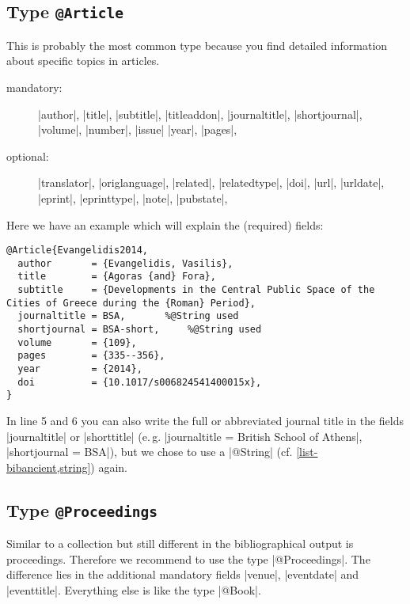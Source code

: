 \documentclass[a4paper,
10pt,
greek,
french,
spanish,
italian,
ngerman,
english
]{ltxdoc}
\begin{document}
\begin{refsection}\end{refsection}


\subsection{Type \texttt{@Article}}\label{article}
 This is probably the most common type 
because you find detailed information about specific topics in articles.

\begin{description}
\item[mandatory:] 
|author|, |title|, |subtitle|, |titleaddon|,
|journaltitle|, |shortjournal|, |volume|, |number|, |issue|
|year|, |pages|, 
\item[optional:]
|translator|, |origlanguage|,
|related|, |relatedtype|,
|doi|, |url|, |urldate|, |eprint|, |eprinttype|, |note|, |pubstate|, 
 \end{description}

Here we have an example which will explain the (required)  fields:
\begin{lstlisting}[style=bibentry,label=Evangelidis2014,caption={{@}Article\{Evangelidis2014,…\} }]
@Article{Evangelidis2014,
  author       = {Evangelidis, Vasilis},
  title        = {Agoras {and} Fora},
  subtitle     = {Developments in the Central Public Space of the Cities of Greece during the {Roman} Period},
  journaltitle = BSA,		%@String used
  shortjournal = BSA-short,		%@String used
  volume       = {109},
  pages        = {335--356},
  year         = {2014},
  doi          = {10.1017/s006824541400015x},
}
\end{lstlisting}
In line 5 and 6 you can also write the full or abbreviated journal title in the fields |journaltitle| or |shorttitle| (e.\,g. |journaltitle = {British School of Athens}|, |shortjournal = {BSA}|), but we chose to use a |@String| (cf. \cref{list-bibancient,string}) again.


\subsection{Type \texttt{@Proceedings}}\label{proceedings}
Similar to a collection but still different in the bibliographical output is proceedings.
Therefore we recommend to use the type |@Proceedings|.
The difference lies in the additional mandatory fields |venue|, |eventdate| and |eventtitle|. 
Everything else is like the type |@Book|.
\end{document}
